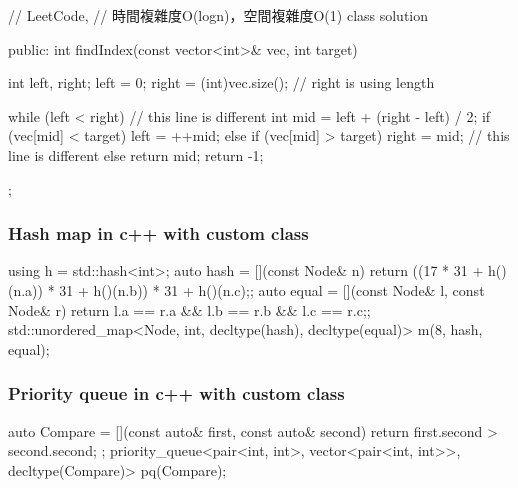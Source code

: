 \begin{Code}
// LeetCode, 
// 時間複雜度O(logn)，空間複雜度O(1)
class solution{
public:
    int findIndex(const vector<int>& vec, int target) {
        int left, right;
        left = 0; right = (int)vec.size(); // right is using length 
        
        while (left < right) { // this line is different
            int mid = left + (right - left) / 2;
            if (vec[mid] < target)
                left = ++mid;
            else if (vec[mid] > target)
                right = mid; // this line is different
            else
                return mid;
        }
        return -1;
    }
};
\end{Code}

\subsubsection{Hash map in c++ with custom class}

\begin{Code}
using h = std::hash<int>;
auto hash = [](const Node& n)
              {return ((17 * 31 + h()(n.a)) * 31 + h()(n.b)) * 31 + h()(n.c);};
auto equal = [](const Node& l, const Node& r)
               {return l.a == r.a && l.b == r.b && l.c == r.c;};
std::unordered_map<Node, int, decltype(hash), decltype(equal)> m(8, hash, equal);
\end{Code}

\subsubsection{Priority queue in c++ with custom class}

\begin{Code}
auto Compare = [](const auto& first, const auto& second)
                  { return first.second > second.second; };
priority_queue<pair<int, int>, vector<pair<int, int>>, decltype(Compare)>
                  pq(Compare);
\end{Code}

